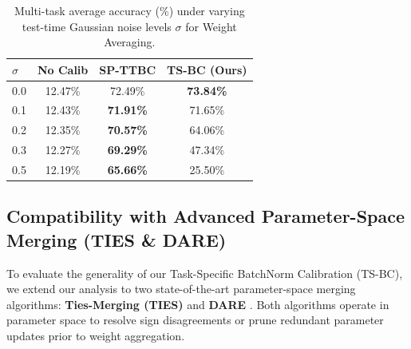 \documentclass{article}
\theoremstyle{plain}
\theoremstyle{definition}
\theoremstyle{remark}
\begin{document}
\begin{table}[t]
\caption{Multi-task average accuracy (\%) under varying test-time Gaussian noise levels $\sigma$ for Weight Averaging.}
\label{tab:robustness}
\vskip 0.15in
\begin{center}
\begin{small}
\begin{tabular}{lccc}
\toprule
$\sigma$ & No Calib & SP-TTBC & TS-BC (Ours) \\
\midrule
0.0 & 12.47\% & 72.49\% & \textbf{73.84\%} \\
0.1 & 12.43\% & \textbf{71.91\%} & 71.65\% \\
0.2 & 12.35\% & \textbf{70.57\%} & 64.06\% \\
0.3 & 12.27\% & \textbf{69.29\%} & 47.34\% \\
0.5 & 12.19\% & \textbf{65.66\%} & 25.50\% \\
\bottomrule
\end{tabular}
\end{small}
\end{center}
\vskip -0.1in
\end{table}

\subsection{Compatibility with Advanced Parameter-Space Merging (TIES \& DARE)}
To evaluate the generality of our Task-Specific BatchNorm Calibration (TS-BC), we extend our analysis to two state-of-the-art parameter-space merging algorithms: \textbf{Ties-Merging (TIES)} \cite{yadav2023ties} and \textbf{DARE} \cite{yu2024dare}. Both algorithms operate in parameter space to resolve sign disagreements or prune redundant parameter updates prior to weight aggregation. 
\end{document}
